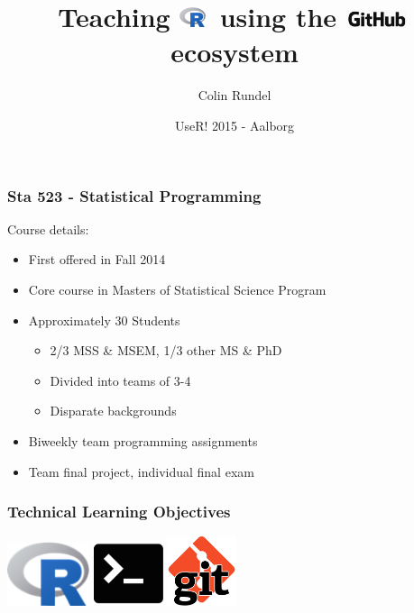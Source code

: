 \documentclass[12pt]{beamer}
\title{Teaching \includegraphics[width=0.3in]{imgs/R.png}$\,$ using the \includegraphics[width=0.7in]{imgs/github.png}$\,$ ecosystem}
\subtitle{}
\date{UseR! 2015 - Aalborg}
\author{Colin Rundel}
\institute{Duke University\\Department of Statistical Science}
\begin{document}
\maketitle


\begin{frame}
\frametitle{Sta 523 - Statistical Programming}

Course details:
\begin{itemize}
\item First offered in Fall 2014
\item Core course in Masters of Statistical Science Program
\item Approximately 30 Students
\begin{itemize}
\item 2/3 MSS \& MSEM, 1/3 other MS \& PhD
\item Divided into teams of 3-4
\item Disparate backgrounds
\end{itemize}
\item Biweekly team programming assignments
\item Team final project, individual final exam
\end{itemize}

\end{frame}


\begin{frame}
\frametitle{Technical Learning Objectives}

\hspace{0.1in}
\includegraphics[width=0.95in]{imgs/R.png}
\hfill
\includegraphics[width=0.8in]{imgs/term.png}
\hfill
\includegraphics[width=0.8in]{imgs/git.jpg}
\hspace{0.1in}

\end{frame}
\end{document}
